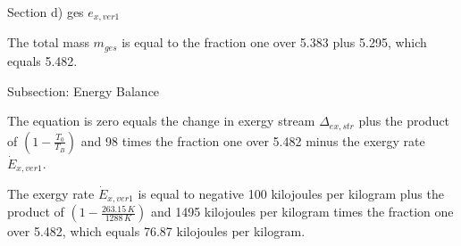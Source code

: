 Section d) ges \( e_{x,ver1} \)

The total mass \( m_{ges} \) is equal to the fraction one over 5.383 plus 5.295, which equals 5.482.

Subsection: Energy Balance

The equation is zero equals the change in exergy stream \( \Delta_{ex,str} \) plus the product of \( \left( 1 - \frac{T_0}{T_B} \right) \) and 98 times the fraction one over 5.482 minus the exergy rate \( \dot{E}_{x,ver1} \).

The exergy rate \( \dot{E}_{x,ver1} \) is equal to negative 100 kilojoules per kilogram plus the product of \( \left( 1 - \frac{263.15 \, K}{1288 \, K} \right) \) and 1495 kilojoules per kilogram times the fraction one over 5.482, which equals 76.87 kilojoules per kilogram.